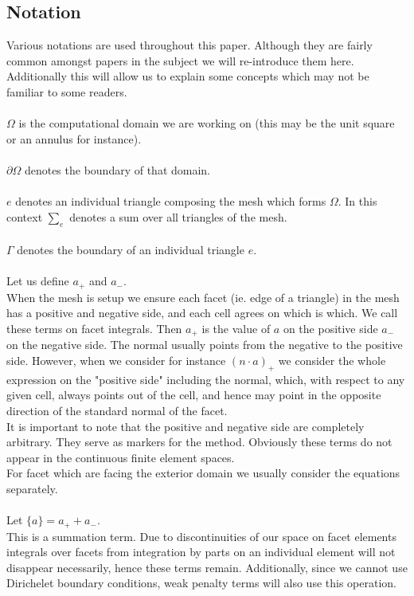 \documentclass[11pt,twoside,a4paper]{article}
\begin{document}
\subsection{Notation}
Various notations are used throughout this paper. Although they are fairly common amongst papers in the subject we will re-introduce them here. Additionally this will allow us to explain some concepts which may not be familiar to some readers.\\
\\
$\Omega$ is the computational domain we are working on (this may be the unit square or an annulus for instance).\\
\\
$\partial \Omega$ denotes the boundary of that domain.\\
\\
$e$ denotes an individual triangle composing the mesh which forms $\Omega$. In this context $\sum_e$ denotes a sum over all triangles of the mesh.\\
\\
$\Gamma$ denotes the boundary of an individual triangle $e$.\\
\\
Let us define $a_+$ and $a_-$.\\
When the mesh is setup we ensure each facet (ie. edge of a triangle) in the mesh has a positive and negative side, and each cell agrees on which is which. We call these terms on facet integrals. Then $a_+$ is the value of $a$ on the positive side $a_-$ on the negative side. The normal usually points from the negative to the positive side. However, when we consider for instance $(n \cdot a)_+$ we consider the whole expression on the "positive side" including the normal, which, with respect to any given cell, always points out of the cell, and hence may point in the opposite direction of the standard normal of the facet.\\
It is important to note that the positive and negative side are completely arbitrary. They serve as markers for the method. Obviously these terms do not appear in the continuous finite element spaces.\\
For facet which are facing the exterior domain we usually consider the equations separately.\\
\\
Let $\{ a \} = a_+ + a_-$. \\
This is a summation term. Due to discontinuities of our space on facet elements integrals over facets from integration by parts on an individual element will not disappear necessarily, hence these terms remain. Additionally, since we cannot use Dirichelet boundary conditions, weak penalty terms will also use this operation.\\
\end{document}
